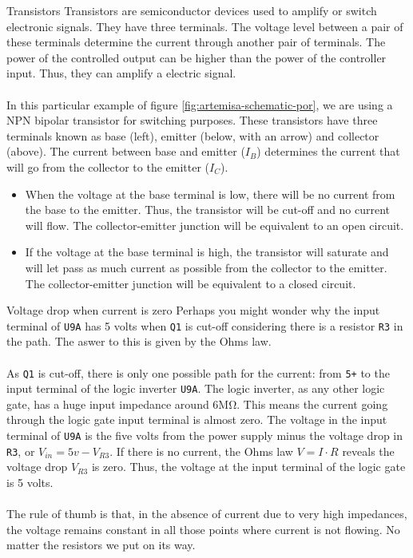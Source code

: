 \begin{theory}[htbp]{Transistors}
  Transistors are semiconductor devices used to amplify or switch electronic signals. They have three terminals. The voltage level between a pair of these terminals determine the current through another pair of terminals. The power of the controlled output can be higher than the power of the controller input. Thus, they can amplify a electric signal.\\\\

  In this particular example of figure \ref{fig:artemisa-schematic-por}, we are using a NPN bipolar transistor for switching purposes. These transistors have three terminals known as base (left), emitter (below, with an arrow) and collector (above). The current between base and emitter ($I_B$) determines the current that will go from the collector to the emitter ($I_C$).\\

  \begin{itemize}
    \item When the voltage at the base terminal is low, there will be no current from the base to the emitter. Thus, the transistor will be cut-off and no current will flow. The collector-emitter junction will be equivalent to an open circuit.
    \item If the voltage at the base terminal is high, the transistor will saturate and will let pass as much current as possible from the collector to the emitter. The collector-emitter junction will be equivalent to a closed circuit.
  \end{itemize}
\end{theory}

\begin{theory}[htbp]{Voltage drop when current is zero}
  Perhaps you might wonder why the input terminal of {\tt U9A} has 5 volts when {\tt Q1} is cut-off considering there is a resistor {\tt R3} in the path. The aswer to this is given by the Ohms law.\\\\

  As {\tt Q1} is cut-off, there is only one possible path for the current: from {\tt 5+} to the input terminal of the logic inverter {\tt U9A}. The logic inverter, as any other logic gate, has a huge input impedance around 6M\si{\ohm}. This means the current going through the logic gate input terminal is almost zero. The voltage in the input terminal of {\tt U9A} is the five volts from the power supply minus the voltage drop in {\tt R3}, or $V_{in} = 5v - V_{R3}$. If there is no current, the Ohms law $V=I \cdot R$ reveals the voltage drop $V_{R3}$ is zero. Thus, the voltage at the input terminal of the logic gate is 5 volts.\\\\

  The rule of thumb is that, in the absence of current due to very high impedances, the voltage remains constant in all those points where current is not flowing. No matter the resistors we put on its way.
\end{theory}

